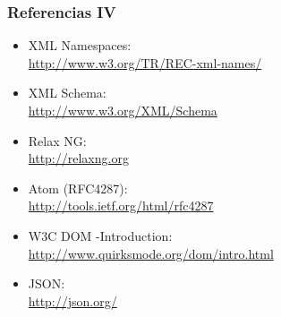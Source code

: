 \begin{frame}
\frametitle{Referencias IV}

\begin{itemize}
\item XML Namespaces: \\
  \url{http://www.w3.org/TR/REC-xml-names/}
\item XML Schema: \\
  \url{http://www.w3.org/XML/Schema}
\item Relax NG: \\
  \url{http://relaxng.org}
\item Atom (RFC4287): \\
  \url{http://tools.ietf.org/html/rfc4287}
\item W3C DOM -Introduction: \\
  \url{http://www.quirksmode.org/dom/intro.html}
\item JSON: \\
  \url{http://json.org/}
\end{itemize}
\end{frame}

